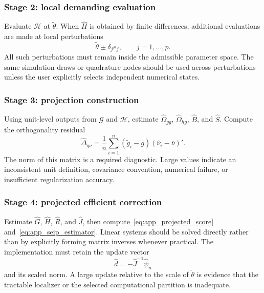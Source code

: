 \subsubsection{Stage 2: local demanding evaluation}

Evaluate $\mathcal H$ at $\widetilde\theta$. When $\widehat H$ is obtained by
finite differences, additional evaluations are made at local perturbations
\[
 \widetilde\theta\pm\delta_j e_j,
 \qquad j=1,\ldots,p.
\]
All such perturbations must remain inside the admissible parameter space. The
same simulation draws or quadrature nodes should be used across perturbations
unless the user explicitly selects independent numerical states.

\subsubsection{Stage 3: projection construction}

Using unit-level outputs from $\mathcal G$ and $\mathcal H$, estimate
$\widehat\Omega_{gg}$, $\widehat\Omega_{hg}$, $\widehat B$, and
$\widehat S$. Compute the orthogonality residual
\begin{equation}
 \widehat\Delta_{g\nu}
 =
 \frac{1}{n}\sum_{i=1}^n
 (\widetilde g_i-\overline g)
 (\widehat\nu_i-\overline\nu)'.
 \label{eq:app_orthogonality_residual}
\end{equation}
The norm of this matrix is a required diagnostic. Large values indicate an
inconsistent unit definition, covariance convention, numerical failure, or
insufficient regularization accuracy.

\subsubsection{Stage 4: projected efficient correction}

Estimate $\widehat G$, $\widehat H$, $\widehat R$, and $\widehat J$, then
compute~\eqref{eq:app_projected_score} and~\eqref{eq:app_seip_estimator}. Linear
systems should be solved directly rather than by explicitly forming matrix
inverses whenever practical. The implementation must retain the update vector
\begin{equation}
 \widehat d
 =
 -\widehat J^{-1}\widehat\psi_n
 \label{eq:app_update_vector}
\end{equation}
and its scaled norm. A large update relative to the scale of
$\widetilde\theta$ is evidence that the tractable localizer or the selected
computational partition is inadequate.

